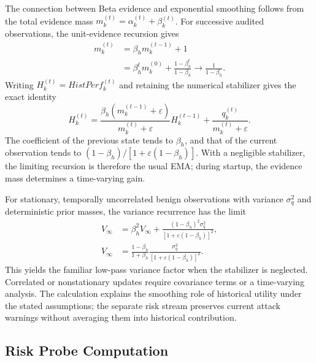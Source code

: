 \documentclass[conference,compsoc]{IEEEtran}
\begin{document}
The connection between Beta evidence and exponential smoothing follows from the total evidence mass $m_k^{(t)}=\alpha_k^{(t)}+\beta_k^{(t)}$. For successive audited observations, the unit-evidence recursion gives
\begin{equation}
    \begin{aligned}
        m_k^{(t)}&=\beta_hm_k^{(t-1)}+1\\
        &=\beta_h^t m_k^{(0)}+\frac{1-\beta_h^t}{1-\beta_h}
        \longrightarrow\frac{1}{1-\beta_h}.
    \end{aligned}
\end{equation}
Writing $H_k^{(t)}=HistPerf_k^{(t)}$ and retaining the numerical stabilizer gives the exact identity
\begin{equation}
    H_k^{(t)}=
    \frac{\beta_h(m_k^{(t-1)}+\varepsilon)}{m_k^{(t)}+\varepsilon}H_k^{(t-1)}
    +\frac{q_k^{(t)}}{m_k^{(t)}+\varepsilon}.
\end{equation}
The coefficient of the previous state tends to $\beta_h$, and that of the current observation tends to $(1-\beta_h)/[1+\varepsilon(1-\beta_h)]$. With a negligible stabilizer, the limiting recursion is therefore the usual EMA; during startup, the evidence mass determines a time-varying gain.

For stationary, temporally uncorrelated benign observations with variance $\sigma_q^2$ and deterministic prior masses, the variance recurrence has the limit
\begin{equation}
    \begin{aligned}
        V_\infty&=\beta_h^2V_\infty+
        \frac{(1-\beta_h)^2\sigma_q^2}{[1+\varepsilon(1-\beta_h)]^2},\\
        V_\infty&=\frac{1-\beta_h}{1+\beta_h}
        \frac{\sigma_q^2}{[1+\varepsilon(1-\beta_h)]^2}.
    \end{aligned}
\end{equation}
This yields the familiar low-pass variance factor when the stabilizer is neglected. Correlated or nonstationary updates require covariance terms or a time-varying analysis. The calculation explains the smoothing role of historical utility under the stated assumptions; the separate risk stream preserves current attack warnings without averaging them into historical contribution.

\subsection{Risk Probe Computation}
\end{document}
